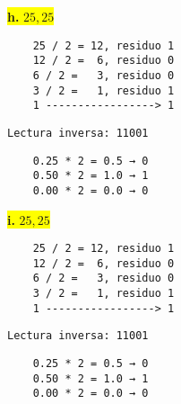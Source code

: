 \documentclass[a4paper,12pt]{article}
\begin{document}
\begin{center}
	\colorbox{yellow}{{\textbf{h.} $25,25$}} \\ \vspace{0.3cm}
\end{center}	
\vspace{-1em}
\begin{minipage}[t]{0.40\textwidth}
	\hspace{2,5cm}
	
	\begin{Verbatim}
	25 / 2 = 12, residuo 1
	12 / 2 =  6, residuo 0
	6 / 2 =   3, residuo 0
	3 / 2 =   1, residuo 1
	1 -----------------> 1
	\end{Verbatim}
	\hspace{1,5cm}\texttt{Lectura inversa: 11001}
\end{minipage}
\hfill
\begin{minipage}[t]{0.40\textwidth}
	\hspace{2cm}
	
	\begin{Verbatim}
	0.25 * 2 = 0.5 → 0
	0.50 * 2 = 1.0 → 1
	0.00 * 2 = 0.0 → 0 
	\end{Verbatim}
\end{minipage}
\begin{center}
	\hspace{2cm}
\end{center}

\begin{center}
	\colorbox{yellow}{{\textbf{i.} $25,25$}} \\ \vspace{0.3cm}
\end{center}	
\vspace{-1em}
\begin{minipage}[t]{0.40\textwidth}
	\hspace{2,5cm}
	
	\begin{Verbatim}
	25 / 2 = 12, residuo 1
	12 / 2 =  6, residuo 0
	6 / 2 =   3, residuo 0
	3 / 2 =   1, residuo 1
	1 -----------------> 1
	\end{Verbatim}
	\hspace{1,5cm}\texttt{Lectura inversa: 11001}
\end{minipage}
\hfill
\begin{minipage}[t]{0.40\textwidth}
	\hspace{2cm}
	
	\begin{Verbatim}
	0.25 * 2 = 0.5 → 0
	0.50 * 2 = 1.0 → 1
	0.00 * 2 = 0.0 → 0 
	\end{Verbatim}
\end{minipage}
\begin{center}
	\hspace{2cm}
\end{center}
\end{document}
